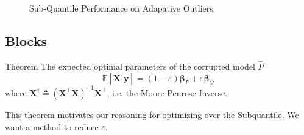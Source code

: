 \documentclass[
11pt, %
serif
]{beamer}
\begin{document}
\begin{frame}
\begin{figure}[!t]
			\caption{Sub-Quantile Performance on Adapative Outliers}
			\label{fig:structure-unstructured-noise}
		\end{figure}
		
	\end{frame}
	
	
	\subsection{Blocks}
	
	\begin{frame}
		\begin{exampleblock}{Theorem}
			The expected optimal parameters of the corrupted model $\hat{P}$
			\begin{equation*}
				\label{eqn:corrupted-optimal}
				\mathbb{E}\left[\boldsymbol{X}^{\dagger}\boldsymbol{y} \right] = (1-\varepsilon)\boldsymbol{\beta}_P + \varepsilon\boldsymbol{\beta}_Q
			\end{equation*}
			where $\boldsymbol{X}^\dagger \triangleq \left(\boldsymbol{X}^\top\boldsymbol{X}\right)^{-1}\boldsymbol{X}^\top$, i.e. the Moore-Penrose Inverse. 
		\end{exampleblock}
		This theorem motivates our reasoning for optimizing over the Subquantile. We want a method to reduce $\varepsilon$. 
	\end{frame}
	
\end{document}
